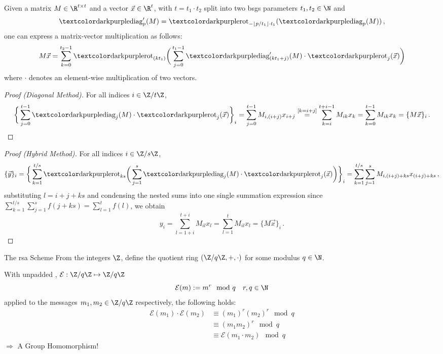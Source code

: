 \begin{frame}[c]
  \begin{theorem}
    Given a matrix $M \in \R^{t \times t}$ and a vector $\vec{x} \in \R^t$, with $t = t_1 \cdot t_2$ split into two \gls{bsgs} parameters $t_1, t_2 \in \N$ and
    $$\diag'_p(M) = \rot_{-\lfloor p/t_1 \rfloor \cdot t_1}(\diag_p(M))\,,$$
    one can express a matrix-vector multiplication as follows:
    \begin{equation*}
      M \vec{x} = \sum_{k=0}^{t_2-1} \rot_{(kt_1)} \bigg(
      \sum_{j=0}^{t_1-1} \diag'_{(kt_1+j)}(M) \cdot \rot_j(\vec{x})
      \bigg)
    \end{equation*}
    where $\cdot$ denotes an element-wise multiplication of two vectors.
  \end{theorem}
\end{frame}

\begin{frame}[c]
  \begin{proof}[Proof (Diagonal Method)]
    For all indices $i \in \Z/t\Z$,
    $$\bigg\{\sum_{j=0}^{t-1} \diag_j(M) \cdot \rot_j(\vec{x})\bigg\}_i
      = \sum_{j=0}^{t-1} M_{i,(i+j)} x_{i+j}
      \overset{[k=i+j]}{=} \sum_{k=i}^{t+i-1} M_{ik} x_k
      = \sum_{k=0}^{t-1} M_{ik} x_k
      = \{M \vec{x}\}_i \,.$$
  \end{proof}
\end{frame}

\begin{frame}[c]
  \begin{proof}[Proof (Hybrid Method)]
    For all indices $i \in \Z/s\Z$,
    $$\{\vec{y}\}_i = \bigg\{\sum_{k=1}^{t / s} \rot_{ks}\bigg(\sum_{j=1}^s \diag_j(M) \cdot \rot_j(\vec{x})\bigg)\bigg\}_i = \sum_{k=1}^{t / s} \sum_{j=1}^{s} M_{i,(i+j) + ks} x_{(i+j) + ks} \,,$$
    substituting $l = i+j+ks$ and condensing the nested sums into one single summation expression since $\sum_{k=1}^{t / s} \sum_{j=1}^{s} f(j+ks) = \sum_{l=1}^{t} f(l)$, we obtain
    $$y_i = \sum_{l=1+i}^{t+i} M_{il} x_l = \sum_{l=1}^{t} M_{il} x_l = \{M \vec{x}\}_i \,.$$
  \end{proof}
\end{frame}

\begin{frame}{The \gls{rsa} Scheme}
  From the integers $\Z$, define the quotient ring $(\Z/q\Z, +, \cdot)$ for some modulus $q \in \N$.

  With unpadded  \parencite{1983-rsa}, $\mathcal{E}: \Z/q\Z \mapsto \Z/q\Z$
  $$\mathcal{E}(m) := m^r \mod q \quad r, q \in \N$$
  applied to the messages $m_1, m_2 \in \Z/q\Z$ respectively, the following holds:
  \begin{align*}
    \mathcal{E}(m_1) \cdot \mathcal{E}(m_2)
     & \equiv (m_1)^r (m_2)^r \mod q            \\
     & \equiv (m_1 m_2)^r \mod q                \\
     & \equiv \mathcal{E}(m_1 \cdot m_2) \mod q
  \end{align*}
  $\Rightarrow$ A Group Homomorphism!
\end{frame}

